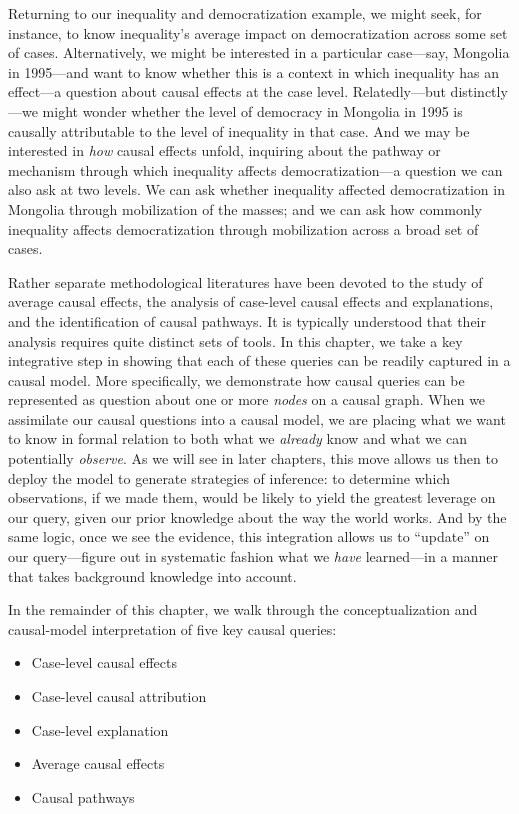 \documentclass[
  12pt,
]{book}
\begin{document}
Returning to our inequality and democratization example, we might seek, for instance, to know inequality's average impact on democratization across some set of cases. Alternatively, we might be interested in a particular case---say, Mongolia in 1995---and want to know whether this is a context in which inequality has an effect---a question about causal effects at the case level. Relatedly---but distinctly---we might wonder whether the level of democracy in Mongolia in 1995 is causally attributable to the level of inequality in that case. And we may be interested in \emph{how} causal effects unfold, inquiring about the pathway or mechanism through which inequality affects democratization---a question we can also ask at two levels. We can ask whether inequality affected democratization in Mongolia through mobilization of the masses; and we can ask how commonly inequality affects democratization through mobilization across a broad set of cases.

Rather separate methodological literatures have been devoted to the study of average causal effects, the analysis of case-level causal effects and explanations, and the identification of causal pathways. It is typically understood that their analysis requires quite distinct sets of tools. In this chapter, we take a key integrative step in showing that each of these queries can be readily captured in a causal model. More specifically, we demonstrate how causal queries can be represented as question about one or more \emph{nodes} on a causal graph. When we assimilate our causal questions into a causal model, we are placing what we want to know in formal relation to both what we \emph{already} know and what we can potentially \emph{observe}. As we will see in later chapters, this move allows us then to deploy the model to generate strategies of inference: to determine which observations, if we made them, would be likely to yield the greatest leverage on our query, given our prior knowledge about the way the world works. And by the same logic, once we see the evidence, this integration allows us to ``update'' on our query---figure out in systematic fashion what we \emph{have} learned---in a manner that takes background knowledge into account.

In the remainder of this chapter, we walk through the conceptualization and causal-model interpretation of five key causal queries:

\begin{itemize}
\item
  Case-level causal effects
\item
  Case-level causal attribution
\item
  Case-level explanation
\item
  Average causal effects
\item
  Causal pathways
\end{itemize}
\end{document}
